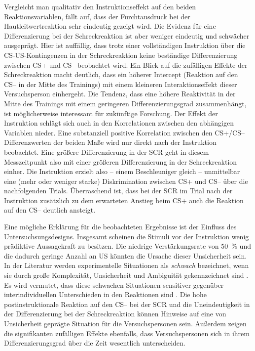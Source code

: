 	Vergleicht man qualitativ den Instruktionseffekt auf den beiden Reaktionsvariablen, fällt auf, dass der Furchtausdruck bei der Hautleitwertreaktion sehr eindeutig gezeigt wird. Die Evidenz für eine Differenzierung bei der Schreckreaktion ist aber weniger eindeutig und schwächer ausgeprägt.
	Hier ist auffällig, dass trotz einer vollständigen Instruktion über die CS-US-Kontingenzen in der Schreckreaktion keine beständige Differenzierung zwischen CS+ und CS-- beobachtet wird. 
	Ein Blick auf die zufälligen Effekte der Schreckreaktion macht deutlich, dass ein höherer Intercept (Reaktion auf den CS-- in der Mitte des Trainings) mit einem kleineren Interaktionseffekt dieser Versuchsperson einhergeht. Die Tendenz, dass eine höhere Reaktivität in der Mitte des Trainings mit einem geringeren Differenzierungsgrad zusammenhängt, ist möglicherweise interessant für zukünftige Forschung.
	Der Effekt der Instruktion schlägt sich auch in den Korrelationen zwischen den abhängigen Variablen nieder. 
	Eine substanziell positive Korrelation zwischen den CS+/CS-- Differenzwerten der beiden Maße wird nur direkt nach der Instruktion beobachtet. 
	Eine größere Differenzierung in der SCR geht in diesem Messzeitpunkt also mit einer größeren Differenzierung in der Schreckreaktion einher. 
	Die Instruktion erzielt also -- einem Beschleuniger gleich -- unmittelbar eine (mehr oder weniger starke) Diskrimination zwischen CS+ und CS-- über die nachfolgenden Trials.
	Überraschend ist, dass bei der SCR im Trial nach der Instruktion zusätzlich zu dem erwarteten Anstieg beim CS+ auch die Reaktion auf den CS-- deutlich ansteigt. 
	

 	Eine mögliche Erklärung für die beobachteten Ergebnisse ist der Einfluss des Untersuchsungsdesigns. 
	Insgesamt scheinen die Stimuli vor der Instruktion wenig prädiktive Aussagekraft zu besitzen. 
	Die niedrige Verstärkungsrate von \SI{50}{\percent} und die dadurch geringe Anzahl an US könnten die Ursache dieser Unsicherheit sein. In der Literatur werden experimentelle Situationen als \textit{schwach} bezeichnet, wenn sie durch große Komplexität, Unsicherheit und Ambiguität gekennzeichnet sind \parencite{LISSEK2006}. Es wird vermutet, dass diese schwachen Situationen sensitiver gegenüber interindividuellen Unterschieden in den Reaktionen sind \parencite{LONSDORF2017fc}. Die hohe postinstruktionale Reaktion auf den CS-- bei der SCR und die Uneindeutigkeit in der Differenzierung bei der Schreckreaktion können Hinweise auf eine von Unsicherheit geprägte Situation für die Versuchspersonen sein. Außerdem zeigen die signifikanten zufälligen Effekte ebenfalls, dass Versuchspersonen sich in ihrem Differenzierungsgrad über die Zeit wesentlich unterscheiden.
		
